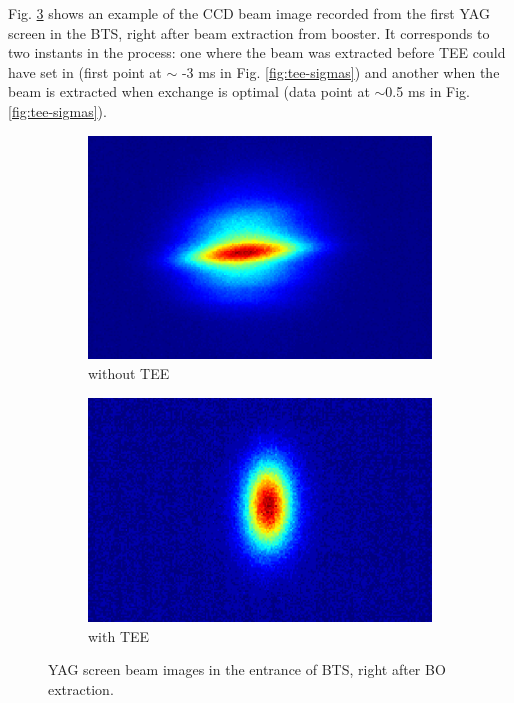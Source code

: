 \documentclass[a4paper,
               keeplastbox,   %
               ]{jacow}
\begin{document}
Fig. \ref{fig:tee-screens} shows an example of the CCD beam image recorded from the first YAG screen in the BTS, right after beam extraction from booster. It corresponds to two instants in the process: one where the beam was extracted before TEE could have set in (first point at $\sim$ -3 ms in Fig. \ref{fig:tee-sigmas}) and another when the beam is extracted when exchange is optimal (data point at $\sim$0.5 ms in Fig. \ref{fig:tee-sigmas}).
\begin{figure}[!htb]
   \centering
   \begin{subfigure}[b]{0.22\textwidth}
         \centering
         \includegraphics*[width=\columnwidth]{THPOPT038_f4a.png}
         \caption{without TEE}
         \label{fig:tee-screens-a}
   \end{subfigure}
   \begin{subfigure}[b]{0.22\textwidth}
         \centering
         \includegraphics*[width=\columnwidth]{THPOPT038_f4b.png}
         \caption{with TEE}
         \label{fig:tee-screens-b}
   \end{subfigure}
   \caption{YAG screen beam images in the entrance of BTS, right after BO extraction.}
   \label{fig:tee-screens}
\end{figure}
\end{document}
